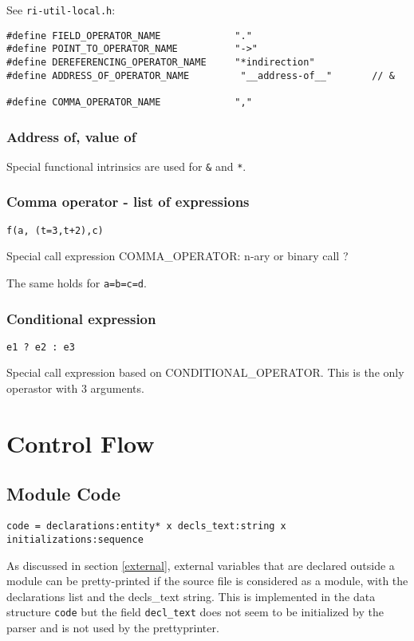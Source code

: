 \documentclass[a4paper]{report}
\begin{document}
See \verb/ri-util-local.h/:
\begin{verbatim}
#define FIELD_OPERATOR_NAME             "."
#define POINT_TO_OPERATOR_NAME          "->"
#define DEREFERENCING_OPERATOR_NAME     "*indirection"
#define ADDRESS_OF_OPERATOR_NAME         "__address-of__"       // &

#define COMMA_OPERATOR_NAME             ","
\end{verbatim}

\subsection{Address of, value of}

Special functional intrinsics are used for \verb/&/ and \texttt{*}.

\subsection{Comma operator - list of expressions}

\lstinline|f(a, (t=3,t+2),c)|

Special call expression COMMA\_OPERATOR: n-ary or binary call ?

The same holds for \lstinline/a=b=c=d/. 

\subsection{Conditional expression}

\lstinline|e1 ? e2 : e3 |

Special call expression based on CONDITIONAL\_OPERATOR. This is the
only operastor with 3 arguments.


\chapter{Control Flow}
\label{chapter:control-flow}

\section{Module Code}

\verb/code = declarations:entity* x decls_text:string x initializations:sequence/

As discussed in section \ref{external}, external variables that are
declared outside a module can be pretty-printed if the source file is
considered as a module, with the declarations list and the decls\_text
string. This is implemented in the data structure \verb/code/ but the
field \verb/decl_text/ does not seem to be initialized by the parser
and is not used by the prettyprinter.
\end{document}
